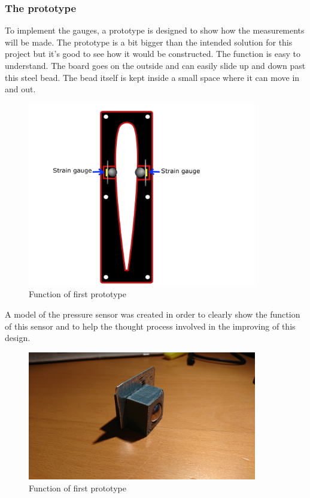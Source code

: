 \subsubsection{The prototype}
To implement the gauges, a prototype is designed to show how the measurements will be made. The prototype is a bit bigger than the intended solution for this project but it's good to see how it would be constructed. The function is easy to understand. The board goes on the outside and can easily slide up and down past this steel bead. The bead itself is kept inside a small space where it can move in and out.
 
\begin{figure}[H]%
\begin{center}
	\includegraphics[width = 10cm]{Figures/Prototyp_1.png}
	\caption{Function of first prototype}
	\label{Press_sens_prot_1}
\end{center}
\end{figure}

A model of the pressure sensor was created in order to clearly show the function of this sensor and to help the thought process involved in the improving of this design.

\begin{figure}[H]%
\begin{center}
	\includegraphics[width = 10cm]{Figures/Press_sens_prot_1.png}
	\caption{Function of first prototype}
	\label{Press_sens_prot_1}
\end{center}
\end{figure}


